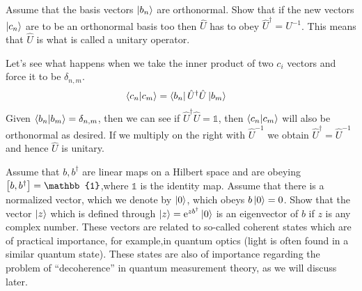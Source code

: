\documentclass[boxes,pages]{homework}
\makeatletter
\newcommand{\inv}[1]{{{#1}^{-1}}}
\newcommand{\herm}[1]{{{#1}^\dagger}}
\newcommand{\e}{\mathrm{e}}
\numberwithin{@problem}{section}
\makeatother
\begin{document}
\begin{problem}
Assume that the basis vectors $\ket{b_n}$ are orthonormal. Show that if the new vectors $\ket{c_n}$ are to be an orthonormal basis too then $\hat{U}$ has to obey $\herm{\hat{U}} = \inv{U}$. This means that $\hat{U}$ is what is called a unitary operator.
\end{problem}

\begin{solution}
	Let's see what happens when we take the inner product of two $c_i$ vectors and force it to be $\delta_{n,m}$.
	\begin{align*}
		\braket{c_n}{c_m} & = \bra{b_n}\herm{\hat{U}}\hat{U}\ket{b_m}
	\end{align*}
	Given $\braket{b_n}{b_m} = \delta_{n,m}$, then we can see if $\herm{\hat{U}}\hat{U} = \mathbb{1}$, then $\braket{c_n}{c_m}$ will also be orthonormal as desired. If we multiply on the right with $\inv{\hat{U}}$ we obtain $\herm{\hat{U}} = \inv{\hat{U}}$ and hence $\hat{U}$ is unitary.
\end{solution}

\begin{problem}
Assume that $b,\herm{b}$ are linear maps on a Hilbert space and are obeying $\comm{b}{\herm{b}} = \mathbb{1}$,where $\mathbb{1}$ is the identity map. Assume that there is a normalized vector, which we denote by $\ket{0}$, which obeys $b\ket{0} = 0$. Show that the vector $\ket{z}$ which is defined through $\ket{z} = \e^{z\herm{b}}\ket{0}$ is an eigenvector of $b$ if $z$ is any complex number. These vectors are related to so-called coherent states which are of practical importance, for example,in quantum optics (light is often found in a similar quantum state). These states are also of importance regarding the problem of ``decoherence'' in quantum measurement theory, as we will discuss later.
\end{problem}
\end{document}
